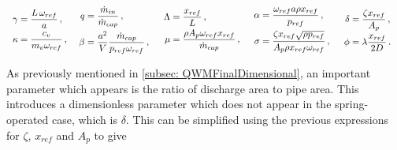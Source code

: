 ~
\begin{equation*}
    \begin{tabular}{p{2.1cm} p{2.8cm} p{3cm} p{3cm} p{2cm}}
        $ \begin{aligned}
            \gamma &= \frac{L \, \omega_{ref}}{a}  \, , \\
            \kappa &= \frac{c_v}{m_v \omega_{ref}} \, ,
        \end{aligned} $
        &
        $ \begin{aligned}
            q &= \frac{\dot{m}_{in}}{\dot{m}_{cap}} \, , \\
            \beta &= \frac{a^2}{V} \frac{\dot{m}_{cap}}{p_{ref} \omega_{ref}} \, ,
        \end{aligned} $
        &
        $ \begin{aligned}
            \Lambda &= \frac{x_{ref}}{L} \, , \\
            \mu &= \frac{\rho A_p \omega_{ref} x_{ref}}{\dot{m}_{cap}} \, ,
        \end{aligned} $
        &
        $ \begin{aligned}
            \alpha &= \frac{\omega_{ref} a \rho x_{ref}}{p_{ref}} \, , \\
            \sigma &= \frac{\zeta x_{ref} \sqrt{\rho p_{ref}}}{A_p \rho x_{ref} \omega_{ref}} \, ,
        \end{aligned} $
        &
        $ \begin{aligned}
            \delta &= \frac{\zeta x_{ref}}{A_p} \, , \\
            \phi &= \lambda \frac{x_{ref}}{2D} \, .
        \end{aligned} $
    \end{tabular}
\end{equation*}

As previously mentioned in \cref{subsec: QWMFinalDimensional}, an important parameter which appears is the ratio of discharge area to pipe area. This introduces a dimensionless parameter which does not appear in the spring-operated case, which is $\delta$. This can be simplified using the previous expressions for $\zeta$, $x_{ref}$ and $A_p$ to give

